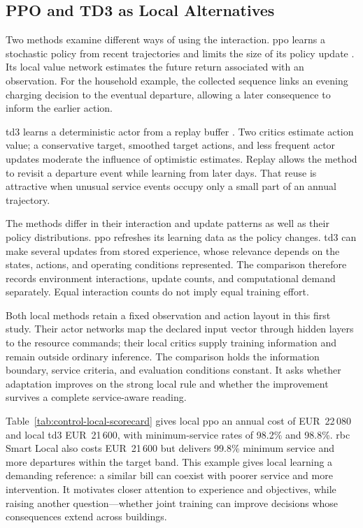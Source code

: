 \subsection{PPO and TD3 as Local Alternatives}

Two methods examine different ways of using the interaction. \gls{ppo} learns a stochastic policy from recent trajectories and limits the size of its policy update \parencite{schulman2017ppo}. Its local value network estimates the future return associated with an observation. For the household example, the collected sequence links an evening charging decision to the eventual departure, allowing a later consequence to inform the earlier action.

\gls{td3} learns a deterministic actor from a replay buffer \parencite{fujimoto2018td3}. Two critics estimate action value; a conservative target, smoothed target actions, and less frequent actor updates moderate the influence of optimistic estimates. Replay allows the method to revisit a departure event while learning from later days. That reuse is attractive when unusual service events occupy only a small part of an annual trajectory.

The methods differ in their interaction and update patterns as well as their policy distributions. \gls{ppo} refreshes its learning data as the policy changes. \gls{td3} can make several updates from stored experience, whose relevance depends on the states, actions, and operating conditions represented. The comparison therefore records environment interactions, update counts, and computational demand separately. Equal interaction counts do not imply equal training effort.

Both local methods retain a fixed observation and action layout in this first study. Their actor networks map the declared input vector through hidden layers to the resource commands; their local critics supply training information and remain outside ordinary inference. The comparison holds the information boundary, service criteria, and evaluation conditions constant. It asks whether adaptation improves on the strong local rule and whether the improvement survives a complete service-aware reading.



\illustrativereading Table~\ref{tab:control-local-scorecard} gives local \gls{ppo} an annual cost of EUR~22\,080 and local \gls{td3} EUR~21\,600, with minimum-service rates of 98.2\% and 98.8\%. \gls{rbc} Smart Local also costs EUR~21\,600 but delivers 99.8\% minimum service and more departures within the target band. This example gives local learning a demanding reference: a similar bill can coexist with poorer service and more intervention. It motivates closer attention to experience and objectives, while raising another question---whether joint training can improve decisions whose consequences extend across buildings.


